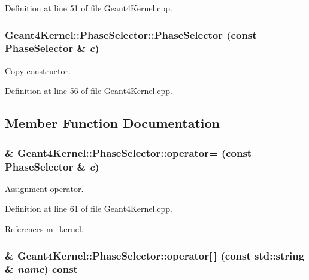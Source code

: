 Definition at line 51 of file Geant4Kernel.cpp.\hypertarget{class_d_d4hep_1_1_simulation_1_1_geant4_kernel_1_1_phase_selector_ab5629568686973076ca92c67f24351ee}{
\subsubsection[{PhaseSelector}]{\setlength{\rightskip}{0pt plus 5cm}Geant4Kernel::PhaseSelector::PhaseSelector (const {\bf PhaseSelector} \& {\em c})}}
\label{class_d_d4hep_1_1_simulation_1_1_geant4_kernel_1_1_phase_selector_ab5629568686973076ca92c67f24351ee}


Copy constructor. 

Definition at line 56 of file Geant4Kernel.cpp.

\subsection{Member Function Documentation}
\hypertarget{class_d_d4hep_1_1_simulation_1_1_geant4_kernel_1_1_phase_selector_a6f83dcf657b82c81042ccdd9e994088d}{
\subsubsection[{operator=}]{ \& Geant4Kernel::PhaseSelector::operator= (const {\bf PhaseSelector} \& {\em c})}}
\label{class_d_d4hep_1_1_simulation_1_1_geant4_kernel_1_1_phase_selector_a6f83dcf657b82c81042ccdd9e994088d}


Assignment operator. 

Definition at line 61 of file Geant4Kernel.cpp.

References m\_\-kernel.\hypertarget{class_d_d4hep_1_1_simulation_1_1_geant4_kernel_1_1_phase_selector_a7d247eeafe80c6b10dfefe393507f008}{
\subsubsection[{operator[]}]{ \& Geant4Kernel::PhaseSelector::operator\mbox{[}$\,$\mbox{]} (const std::string \& {\em name}) const}}
\label{class_d_d4hep_1_1_simulation_1_1_geant4_kernel_1_1_phase_selector_a7d247eeafe80c6b10dfefe393507f008}


